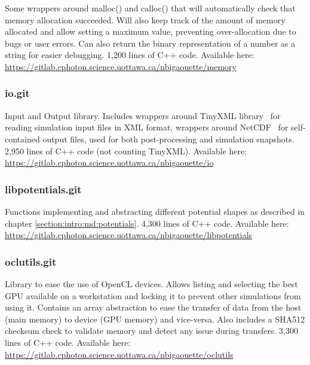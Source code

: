 Some wrappers around malloc() and calloc() that will automatically check that
memory allocation succeeded. Will also keep track of the amount of
memory allocated and allow setting a maximum value, preventing
over-allocation due to bugs or user errors. Can also return the binary
representation of a number as a string for easier debugging. 1,200 lines of
C++ code. Available here:\\
\url{https://gitlab.cphoton.science.uottawa.ca/nbigaouette/memory}


\subsubsection{io.git} \label{section:tools:libraries:io}

Input and Output library. Includes wrappers around TinyXML library~\cite{tinyxml}
for reading simulation input files in XML format,
wrappers around NetCDF~\cite{netcdf} for self-contained
output files, used for both post-processing and simulation snapshots.
2,950 lines of C++ code (not counting TinyXML). Available here:\\
\url{https://gitlab.cphoton.science.uottawa.ca/nbigaouette/io}


\subsubsection{libpotentials.git} \label{section:tools:libraries:libpotentials}

Functions implementing and abstracting different potential shapes as
described in chapter \ref{section:intro:md:potentials}. 4,300 lines of C++ code.
Available here:\\
\url{https://gitlab.cphoton.science.uottawa.ca/nbigaouette/libpotentials}


\subsubsection{oclutils.git} \label{section:tools:libraries:oclutils}

Library to ease the use of OpenCL devices. Allows listing and selecting the
best GPU available on a workstation and locking it to prevent
other simulations from using it. Contains an array abstraction to ease the
transfer of data from the host (main memory) to device (GPU memory) and
vice-versa. Also includes a SHA512 checksum check to validate memory
and detect any issue during transfers. 3,300 lines of C++ code.
Available here:
\url{https://gitlab.cphoton.science.uottawa.ca/nbigaouette/oclutils}



